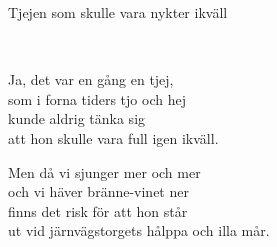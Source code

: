 \begin{song}{Tjejen som skulle vara nykter ikväll}
	
	
	\\
	
	Ja, det var en gång en tjej,\\
	som i forna tiders tjo och hej\\
	kunde aldrig tänka sig\\
	att hon skulle vara full igen ikväll.
	
	Men då vi sjunger mer och mer\\
	och vi häver bränne-vinet ner\\
	finns det risk för att hon står\\
	ut vid järnvägstorgets hålppa och illa mår.
	
\end{song}
